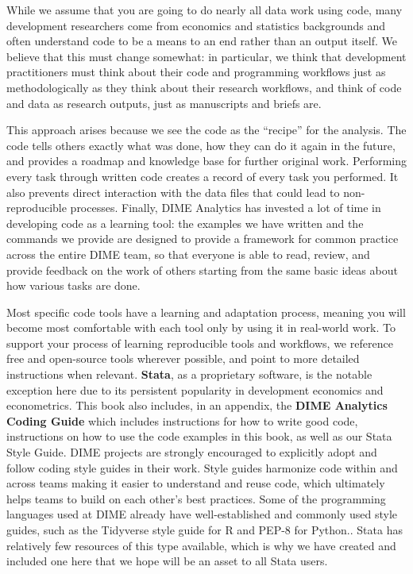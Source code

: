 While we assume that you are going to do nearly all data work using code,
many development researchers come from economics and statistics backgrounds
and often understand code to be a means to an end rather than an output itself.
We believe that this must change somewhat:
in particular, we think that development practitioners
must think about their code and programming workflows
just as methodologically as they think about their research workflows,
and think of code and data as research outputs, just as manuscripts and briefs are.

This approach arises because we see the code as the ``recipe'' for the analysis.
The code tells others exactly what was done,
how they can do it again in the future,
and provides a roadmap and knowledge base for further original work.\cite{hamermesh2007replication}
Performing every task through written code
creates a record of every task you performed.\cite{ozier2019replication}
It also prevents direct interaction
with the data files that could lead to non-reproducible processes.\cite{chang2015economics}
Finally, DIME Analytics has invested a lot of time in developing code as a learning tool:
the examples we have written and the commands we provide
are designed to provide a framework for common practice
across the entire DIME team, so that everyone is able to
read, review, and provide feedback on the work of others
starting from the same basic ideas about how various tasks are done.

Most specific code tools have a learning and adaptation process,
meaning you will become most comfortable with each tool
only by using it in real-world work.
To support your process of learning reproducible tools and workflows,
we reference free and open-source tools wherever possible,
and point to more detailed instructions when relevant.
\textbf{Stata},\cite{statacorp2019stata}
as a proprietary software, is the notable exception here
due to its persistent popularity in development economics and econometrics.
This book also includes, in an appendix,
the \textbf{DIME Analytics Coding Guide}
which includes instructions for how to write good code,
instructions on how to use the code examples in this book,
as well as our Stata Style Guide.
DIME projects are strongly encouraged to
explicitly adopt and follow coding style guides in their work.
Style guides harmonize code within and across teams
making it easier to understand and reuse code,
which ultimately helps teams to
build on each other's best practices.
Some of the programming languages used at DIME
already have well-established and commonly used style guides,
such as the Tidyverse style guide for R
and PEP-8 for Python..
Stata has relatively few resources of this type available,
which is why we have created and included one here that
we hope will be an asset to all Stata users.

